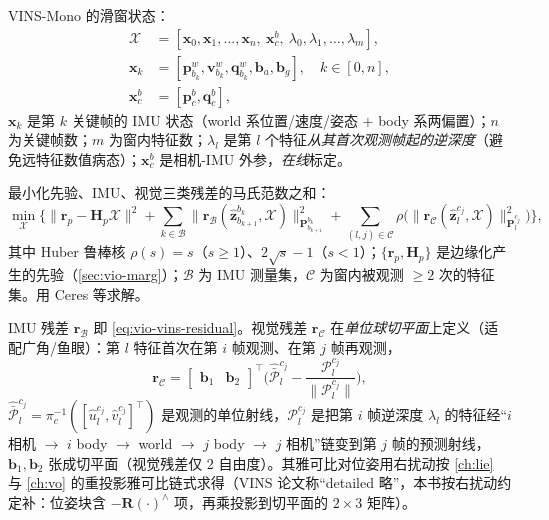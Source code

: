 \begin{definition}[滑窗全状态向量]\label{def:vio-state}
VINS-Mono 的滑窗状态\cite{qin2018vins}：
\begin{equation}
\begin{aligned}
  \mathcal{X}&=[\mathbf{x}_0,\mathbf{x}_1,\dots,\mathbf{x}_n,\ \mathbf{x}^b_c,\ \lambda_0,\lambda_1,\dots,\lambda_m],\\
  \mathbf{x}_k&=[\mathbf{p}^w_{b_k},\mathbf{v}^w_{b_k},\mathbf{q}^w_{b_k},\mathbf{b}_a,\mathbf{b}_g],\quad k\in[0,n],\\
  \mathbf{x}^b_c&=[\mathbf{p}^b_c,\mathbf{q}^b_c],
\end{aligned}
  \label{eq:vio-vins-state}
\end{equation}
$\mathbf{x}_k$ 是第 $k$ 关键帧的 IMU 状态（world 系位置/速度/姿态 $+$ body 系两偏置）；$n$ 为关键帧数；$m$ 为窗内特征数；$\lambda_l$ 是第 $l$ 个特征\emph{从其首次观测帧起的逆深度}（避免远特征数值病态）；$\mathbf{x}^b_c$ 是相机-IMU 外参，\emph{在线}标定。
\end{definition}

\begin{theorem}\label{thm:vio-ba}
最小化先验、IMU、视觉三类残差的马氏范数之和\cite{qin2018vins}：
\begin{equation}
  \min_{\mathcal{X}}\Big\{\|\mathbf{r}_p-\mathbf{H}_p\mathcal{X}\|^2
  +\sum_{k\in\mathcal{B}}\|\mathbf{r}_{\mathcal{B}}(\hat{\mathbf{z}}^{b_k}_{b_{k+1}},\mathcal{X})\|^2_{\mathbf{P}^{b_k}_{b_{k+1}}}
  +\sum_{(l,j)\in\mathcal{C}}\rho\big(\|\mathbf{r}_{\mathcal{C}}(\hat{\mathbf{z}}^{c_j}_l,\mathcal{X})\|^2_{\mathbf{P}^{c_j}_l}\big)\Big\},
  \label{eq:vio-ba}
\end{equation}
其中 Huber 鲁棒核 $\rho(s)=s$（$s\ge1$）、$2\sqrt{s}-1$（$s<1$）；$\{\mathbf{r}_p,\mathbf{H}_p\}$ 是边缘化产生的先验（\cref{sec:vio-marg}）；$\mathcal{B}$ 为 IMU 测量集，$\mathcal{C}$ 为窗内被观测 $\ge2$ 次的特征集。用 Ceres 等求解。
\end{theorem}

IMU 残差 $\mathbf{r}_{\mathcal{B}}$ 即 \cref{eq:vio-vins-residual}。视觉残差 $\mathbf{r}_{\mathcal{C}}$ 在\emph{单位球切平面}上定义（适配广角/鱼眼）：第 $l$ 特征首次在第 $i$ 帧观测、在第 $j$ 帧再观测，
\begin{equation}
  \mathbf{r}_{\mathcal{C}}=\begin{bmatrix}\mathbf{b}_1&\mathbf{b}_2\end{bmatrix}^\top\Big(\hat{\bar{\mathcal{P}}}^{c_j}_l-\frac{\mathcal{P}^{c_j}_l}{\|\mathcal{P}^{c_j}_l\|}\Big),
  \label{eq:vio-vis-residual}
\end{equation}
$\hat{\bar{\mathcal{P}}}^{c_j}_l=\pi_c^{-1}([\hat u^{c_j}_l,\hat v^{c_j}_l]^\top)$ 是观测的单位射线，$\mathcal{P}^{c_j}_l$ 是把第 $i$ 帧逆深度 $\lambda_l$ 的特征经“$i$ 相机 $\to$ $i$ body $\to$ world $\to$ $j$ body $\to$ $j$ 相机”链变到第 $j$ 帧的预测射线，$\mathbf{b}_1,\mathbf{b}_2$ 张成切平面（视觉残差仅 $2$ 自由度）。其雅可比对位姿用右扰动按 \cref{ch:lie} 与 \cref{ch:vo} 的重投影雅可比链式求得（VINS 论文称“detailed 略”，本书按右扰动约定补：位姿块含 $-\mathbf{R}(\cdot)^\wedge$ 项，再乘投影到切平面的 $2\times3$ 矩阵）。

